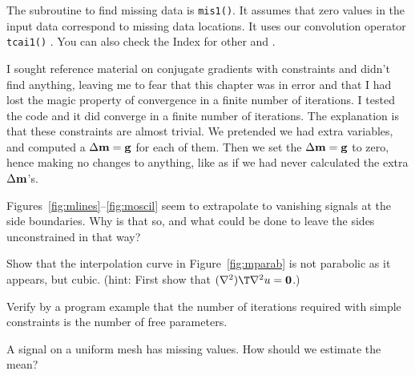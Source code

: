 \par
The subroutine to find missing data is \texttt{mis1()}.
It assumes that zero values in the input data
correspond to missing data locations.
It uses our convolution operator
\texttt{tcai1()} .
You can also check the Index for other
 and .
\noindent


\par
I sought reference material on conjugate gradients with constraints
and didn't find anything,
leaving me to fear that this chapter was in error
and that I had lost the magic property of convergence
in a finite number of iterations.
I tested the code and it did converge in a finite number of iterations.
The explanation is that these constraints are almost trivial.
We pretended we had extra variables,
and computed a $\Delta \bold m =\bold g$ for each of them.
Then we set the $\Delta \bold m =\bold g$ to zero,
hence making no changes to anything,
like as if we had never calculated the extra  $\Delta \bold m$'s.

\begin{exer}
\item
        Figures~\ref{fig:mlines}--\ref{fig:moscil}
        seem to extrapolate to vanishing signals at the side boundaries.
        Why is that so, and what could be done to leave the sides
        unconstrained in that way?
\item
        Show that the interpolation curve in Figure~\ref{fig:mparab} is not
        parabolic as it appears, but cubic.
        ({\sc hint}:  First show that $(\nabla^2)\T\nabla^2 u = \bold 0$.)
        \item
        Verify by a program example that the number of iterations
        required with simple constraints is the number of free parameters.
\item
        A signal on a uniform mesh has missing values.
        How should we estimate the mean?
\end{exer}

